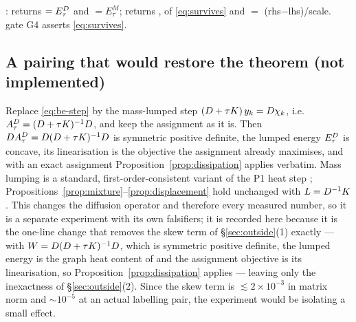\documentclass[11pt,a4paper]{article}
\begin{document}
\begin{tcolorbox}[colback=blue!4!white, colframe=blue!40!black,
                  title={Code: energies and the gate}, fontupper=\small]
: 
returns  $= E^{D}_\tau$ and  $= E^M_\tau$;
 returns
,  of \eqref{eq:survives} and  $=$ (rhs$-$lhs)/scale.
 gate G4 asserts \eqref{eq:survives}.
\end{tcolorbox}

\subsection{A pairing that would restore the theorem (not implemented)}
\label{sec:lumped-pairing}

\begin{remark}
Replace \eqref{eq:be-step} by the mass-lumped step
$(D + \tau K)\, y_k = D \chi_k$, i.e.\ $A_\tau^{D} = (D + \tau K)^{-1}D$,
and keep the assignment as it is. Then $DA_\tau^{D} = D(D + \tau K)^{-1}D$
is symmetric positive definite, the lumped energy $E^{D}_\tau$ is concave,
its linearisation is the objective the assignment already maximises, and with an
exact assignment Proposition~\ref{prop:dissipation} applies verbatim. Mass
lumping is a standard, first-order-consistent variant of the P1 heat step
\cite{dziuk2013surfacefem}; Propositions~\ref{prop:mixture}--\ref{prop:displacement}
hold unchanged with $L = D^{-1}K$. This changes the diffusion operator and
therefore every measured number, so it is a separate experiment with its own
falsifiers; it is recorded here because it is the one-line change that removes the skew
term of \S\ref{sec:outside}(1) exactly --- with $W = D(D + \tau K)^{-1}D$,
which is symmetric positive definite, the lumped energy is the graph heat
content of \cite[\S5.2]{jacobs2018auction} and the assignment objective is its
linearisation, so Proposition~\ref{prop:dissipation} applies --- leaving only
the inexactness of \S\ref{sec:outside}(2). Since the skew term is
$\lesssim 2 \times 10^{-3}$ in matrix norm and $\sim 10^{-5}$ at an actual
labelling pair, the experiment would be isolating a small effect.
\end{remark}
\end{document}
